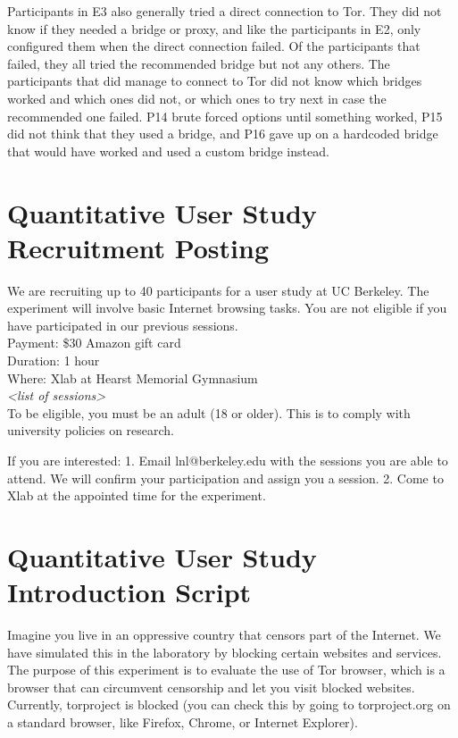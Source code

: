 \documentclass[USenglish,oneside,twocolumn]{article}
\begin{document}
Participants in E3 also generally tried a direct connection to Tor. They did not know if they needed a bridge or proxy, and like the participants in E2, only configured them when the direct connection failed. Of the participants that failed, they all tried the recommended bridge but not any others. The participants that did manage to connect to Tor did not know which bridges worked and which ones did not, or which ones to try next in case the recommended one failed. P14 brute forced options until something worked, P15 did not think that they used a bridge, and P16 gave up on a hardcoded bridge that would have worked and used a custom bridge instead.

\section{Quantitative User Study Recruitment Posting}
\label{quantitative-recruitment}
We are recruiting up to 40 participants for a user study at UC Berkeley. 
The experiment will involve basic Internet browsing tasks. You are not eligible if you have participated in our previous sessions.\\

\indent Payment: \$30 Amazon gift card\\
\indent Duration: 1 hour \\
\indent Where: Xlab at Hearst Memorial Gymnasium\\

\textit{<list of sessions>}\\

To be eligible, you must be an adult (18 or older). This is to comply with university policies on research. 

If you are interested: 1. Email lnl@berkeley.edu 
with the sessions you are able to attend. We will confirm your participation and assign you a session. 
2. Come to Xlab 
at the appointed time for the experiment.

\section{Quantitative User Study Introduction Script} 
\label{quantitative-script} 
Imagine you live in an oppressive country that censors part of the Internet. We have simulated this in the laboratory by blocking certain websites and services.  The purpose of this experiment is to evaluate the use of Tor browser, which is a browser that can circumvent censorship and let you visit blocked websites. Currently, torproject is blocked (you can check this by going to torproject.org on a standard browser, like Firefox, Chrome, or Internet Explorer). 
\end{document}

